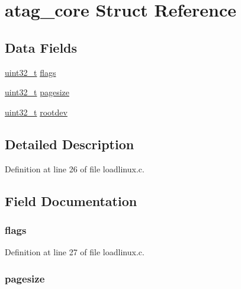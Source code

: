 \hypertarget{structatag__core}{\section{atag\-\_\-core \-Struct \-Reference}
\label{structatag__core}
}
\subsection*{\-Data \-Fields}
\begin{DoxyCompactItemize}
\item 
\hyperlink{arch__types_8h_a435d1572bf3f880d55459d9805097f62}{uint32\-\_\-t} \hyperlink{structatag__core_a773b39d480759f67926cb18ae2219281}{flags}
\item 
\hyperlink{arch__types_8h_a435d1572bf3f880d55459d9805097f62}{uint32\-\_\-t} \hyperlink{structatag__core_a64a0f9cfdfcb358f8c69a1fa4ddd4742}{pagesize}
\item 
\hyperlink{arch__types_8h_a435d1572bf3f880d55459d9805097f62}{uint32\-\_\-t} \hyperlink{structatag__core_a79dc316159f961edcc34cc3a22db5260}{rootdev}
\end{DoxyCompactItemize}


\subsection{\-Detailed \-Description}


\-Definition at line 26 of file loadlinux.\-c.



\subsection{\-Field \-Documentation}
\hypertarget{structatag__core_a773b39d480759f67926cb18ae2219281}{
\subsubsection[{flags}]{ {\bf flags}}}\label{structatag__core_a773b39d480759f67926cb18ae2219281}


\-Definition at line 27 of file loadlinux.\-c.

\hypertarget{structatag__core_a64a0f9cfdfcb358f8c69a1fa4ddd4742}{
\subsubsection[{pagesize}]{ {\bf pagesize}}}\label{structatag__core_a64a0f9cfdfcb358f8c69a1fa4ddd4742}


